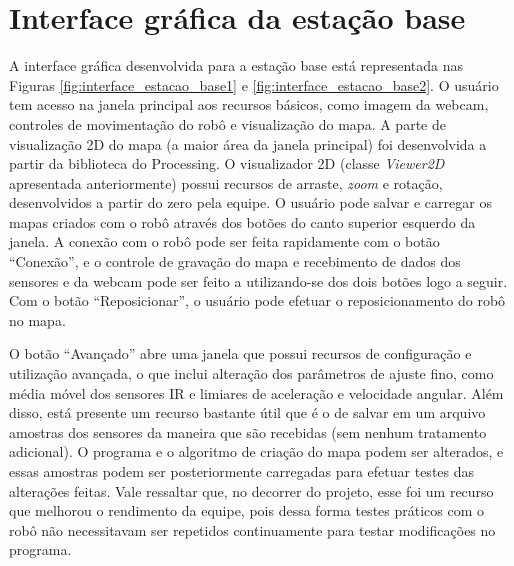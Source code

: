\chapter{Interface gráfica da estação base}

A interface gráfica desenvolvida para a estação base está representada nas Figuras \ref{fig:interface_estacao_base1} e \ref{fig:interface_estacao_base2}. O usuário tem acesso na janela principal aos recursos básicos, como imagem da webcam, controles de movimentação do robô e visualização do mapa.
A parte de visualização 2D do mapa (a maior área da janela principal) foi desenvolvida a partir da biblioteca do Processing. O visualizador 2D (classe \textit{Viewer2D} apresentada anteriormente) possui recursos de arraste, \textit{zoom} e rotação, desenvolvidos a partir do zero pela equipe. O usuário pode salvar e carregar os mapas criados com o robô através dos botões do canto superior esquerdo da janela. A conexão com o robô pode ser feita rapidamente com o botão ``Conexão'', e o controle de gravação do mapa e recebimento de dados dos sensores e da webcam pode ser feito a utilizando-se dos dois botões logo a seguir. Com o botão ``Reposicionar'', o usuário pode efetuar o reposicionamento do robô no mapa. 

O botão ``Avançado'' abre uma janela que possui recursos de configuração e utilização avançada, o que inclui alteração dos parâmetros de ajuste fino, como média móvel dos sensores IR e limiares de aceleração e velocidade angular. Além disso, está presente um recurso bastante útil que é o de salvar em um arquivo amostras dos sensores da maneira que são recebidas (sem nenhum tratamento adicional). O programa e o algoritmo de criação do mapa podem ser alterados, e essas amostras podem ser posteriormente carregadas para efetuar testes das alterações feitas. Vale ressaltar que, no decorrer do projeto, esse foi um recurso que melhorou o rendimento da equipe, pois dessa forma testes práticos com o robô não necessitavam ser repetidos continuamente para testar modificações no programa.

